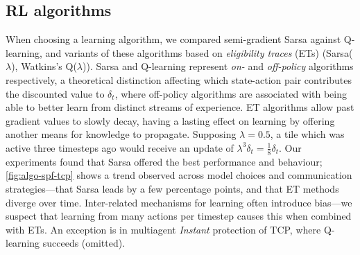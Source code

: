 \documentclass[10pt, times, conference, letterpaper]{IEEEtran}
\begin{document}
%

\subsection{RL algorithms}
When choosing a learning algorithm, we compared semi-gradient Sarsa against Q-learning, and variants of these algorithms based on \emph{eligibility traces} (ETs) (Sarsa($\lambda$), Watkins's Q($\lambda$)).
Sarsa and Q-learning represent \emph{on-} and \emph{off-policy} algorithms respectively, a theoretical distinction affecting which state-action pair contributes the discounted value to $\delta_t$, where off-policy algorithms are associated with being able to better learn from distinct streams of experience.
ET algorithms allow past gradient values to slowly decay, having a lasting effect on learning by offering another means for knowledge to propagate.
Supposing $\lambda=0.5$, a tile which was active three timesteps ago would receive an update of $\lambda^3\delta_t=\frac{1}{8} \delta_t$.
Our experiments found that Sarsa offered the best performance and behaviour; \cref{fig:algo-spf-tcp} shows a trend observed across model choices and communication strategies---that Sarsa leads by a few percentage points, and that ET methods diverge over time.
Inter-related mechanisms for learning often introduce bias---we suspect that learning from many actions per timestep causes this when combined with ETs.
An exception is in multiagent \emph{Instant} protection of TCP, where Q-learning succeeds (omitted).
\end{document}
